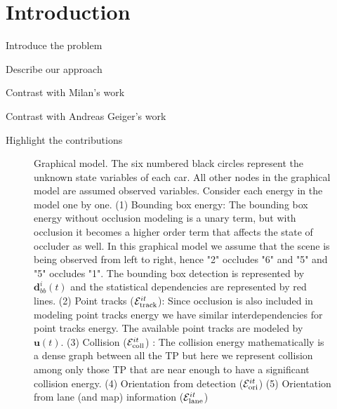 \section{Introduction}
\label{sec:intro}

\begin{tight_itemize}
  \item Introduce the problem
  \item Describe our approach
  \item Contrast with Milan's work
  \item Contrast with Andreas Geiger's work
  \item Highlight the contributions
\end{tight_itemize}
\vspace{10cm}
\begin{figure}[!!t]
  \begin{center}
  
  \end{center}
  \caption{Graphical model. The six numbered black circles represent the
    unknown state variables of each car. All other nodes in the graphical model
    are assumed
    observed variables. Consider each energy in the model one by one. (1)
    Bounding box energy: The bounding box energy without occlusion modeling is
    a unary term, but with occlusion it becomes a higher order term that
    affects the state of occluder as well. In this graphical model we assume
    that the scene is being observed from left to right, hence "2" occludes "6"
    and "5" and "5" occludes "1". The bounding box detection is represented by
  $\mathbf{d}_{bb}^i(t)$ and the statistical dependencies are represented by
  red lines. (2) Point tracks ($\mathcal{E}^{it}_{\text{track}}$): Since occlusion is also
  included in modeling point tracks energy we have similar interdependencies
  for point tracks energy. The available point tracks are modeled by
  $\mathbf{u}(t)$. (3) Collision ($\mathcal{E}^{it}_{\text{coll}}$) : The collision energy
  mathematically is a dense graph between all the TP but here we represent
  collision among only those TP that are near enough to have a significant
collision energy. (4) Orientation from detection ($\mathcal{E}^{it}_{\text{ori}}$) (5) Orientation from lane (and map) information ($\mathcal{E}^{it}_{\text{lane}}$)}
  \label{fig:graphmodel}
\end{figure}
\begin{figure}
  \centering
  
\end{figure}
